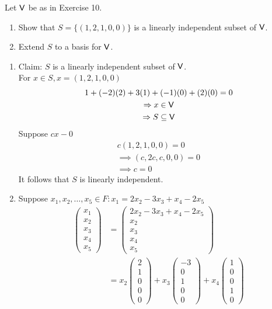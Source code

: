 Let $\mathsf{V}$ be as in Exercise 10.
\begin{enumerate}
\item Show that $S=\{(1,2,1,0,0)\}$ is a linearly independent subset
  of $\mathsf{V}$.
\item Extend $S$ to a basis for $\mathsf{V}$.
\end{enumerate}
\begin{enumerate}
\item Claim: $S$ is a linearly independent subset of $\mathsf{V}$.
\\For $x \in S, x = (1,2,1,0,0)$
\begin{gather}
1+ (-2)(2) + 3(1) +(-1)(0) +(2)(0) = 0\\
\Rightarrow x \in \mathsf{V}\\
\Rightarrow S \subseteq \mathsf{V}
\end{gather}
Suppose $cx -0$ 
\begin{gather}
c(1,2,1,0,0) = 0\\
\implies (c,2c,c,0,0) = 0\\
\implies c =0
\end{gather}
It follows that $S$ is linearly independent.
\item Suppose $x_1,x_2,\dotsc,x_5 \in F \colon x_1 = 2x_2 -3x_3 +x_4
  -2x_5$ 
\begin{align}
\begin{pmatrix}x_1\\x_2\\x_3\\x_4\\x_5\end{pmatrix} &= \begin{pmatrix}2x_2 -3x_3 +x_4 -2x_5\\x_2\\x_3\\x_4\\x_5\end{pmatrix}\\
&= x_2\begin{pmatrix}2\\1\\0\\0\\0\end{pmatrix}
+x_3\begin{pmatrix}-3\\0\\1\\0\\0\end{pmatrix}
+x_4\begin{pmatrix}1\\0\\0\\1\\0\end{pmatrix}

\end{align}
\end{enumerate}

